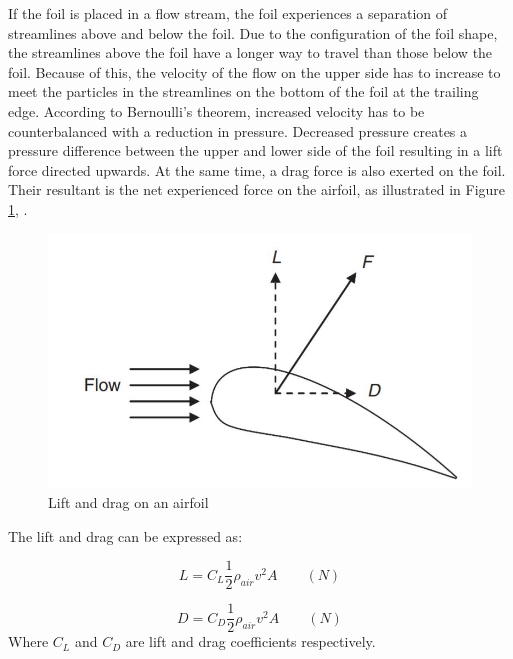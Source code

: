 \noindent If the foil is placed in a flow stream, the foil experiences a separation of streamlines above and below the foil. Due to the configuration of the foil shape, the streamlines above the foil have a longer way to travel than those below the foil. Because of this, the velocity of the flow on the upper side has to increase to meet the particles in the streamlines on the bottom of the foil at the trailing edge. According to Bernoulli's theorem, increased velocity has to be counterbalanced with a reduction in pressure. Decreased pressure creates a pressure difference between the upper and lower side of the foil resulting in a lift force directed upwards. At the same time, a drag force is also exerted on the foil. Their resultant is the net experienced force on the airfoil, as illustrated in Figure \ref{fig:liftdrag}, \cite{MATHEW2012}. 

\begin{figure}[H]
\centering
\includegraphics[scale=0.6]{figures/liftdrag}
\caption[$\; \:$Lift and drag on an airfoil]{Lift and drag on an airfoil \cite{MATHEW2012} }
 \label{fig:liftdrag}
\end{figure}

 \noindent The lift and drag can be expressed as:

 \begin{equation}
    L = C_L\frac{1}{2}\rho_{air} v^2 A \qquad (N)
\end{equation}

\begin{equation}
    D = C_D\frac{1}{2}\rho_{air} v^2 A \qquad (N)
\end{equation}
Where $C_L$ and $C_D$ are lift and drag coefficients respectively.\newline 
\newline

